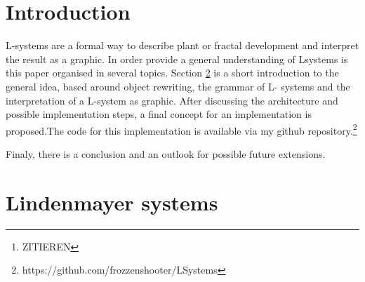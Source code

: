\documentclass[english]{cpp-hmwk}
\begin{document}

\begin{abstract}
Lindenmayer Systems, short L-systems, are the result of \textbf{research from Lindenmayer et al.}\footnote{ZITIEREN} about the geometric features of plants.
L-systems are a concept to mathematicaly/formal describe and model the growth processes of plant development. They are not only restricted to the plant based developments, but can also be used to generate fractals.

L-systems have an inital state and use rules, like a formal grammar, to transform or rather rewrite the current state to create the next state of the development from a plant or a fractal.
It is therefore possible to successive calculate each state of the development.
Such a state of a L-system can be interpreted as commands for a turtle graphic, which creates the opportunity to draw the created fractals or plant states. 

Goal of this paper is to design an architecture for L-systems, which includes an implementation for L-systems, their creation and an interface for a turtle graphic. The interface should enable the polymorphic use of different turtle graphic implementations and enable drawing of the L-system state.
\end{abstract}

\pagebreak
\section{Introduction}
L-systems are a formal way to describe plant or fractal development and interpret the result as a graphic. In order provide a general understanding of Lsystems is this  paper organised in several topics. Section \ref{section:lindenmayer} is a short introduction to the general idea,  based around object rewriting, the grammar of L- systems and the interpretation of a L-system as graphic.
After discussing the architecture and possible implementation steps, a final concept for an implementation is proposed.The code for this implementation is available via my github repository.\footnote{https://github.com/frozzenshooter/LSystems}

Finaly, there is a conclusion and an outlook for possible future extensions.

\section{Lindenmayer systems}
\label{section:lindenmayer}
\end{document}
